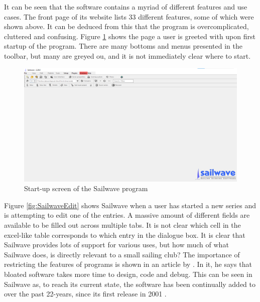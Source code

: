 \documentclass{l4proj}
\begin{document}
It can be seen that the software contains a myriad of different features and use cases. The front page of its website lists 33 different features, some of which were shown above. It can be deduced from this that the program is overcomplicated, cluttered and confusing.
Figure \ref{fig:SailwaveEmpty} shows the page a user is greeted with upon first startup of the program. There are many bottoms and menus presented in the toolbar, but many are greyed ou, and it is not immediately clear where to start.

\begin{figure}[H]
    \centering
    \includegraphics[width=1\linewidth]{images/SailwaveEmpty.png} 

    \caption{Start-up screen of the Sailwave program \citep{sailwave}
    }

    \label{fig:SailwaveEmpty} 
\end{figure}

Figure \ref{fig:SailwaveEdit} shows Sailwave when a user has started a new series and is attempting to edit one of the entries. A massive amount of different fields are available to be filled out across multiple tabs. It is not clear which cell in the excel-like table corresponds to which entry in the dialogue box. It is clear that Sailwave provides lots of support for various uses, but how much of what Sailwave does, is directly relevant to a small sailing club? The importance of restricting the features of programs is shown in an article by \citet{leanSoftware}. In it, he says that bloated software takes more time to design, code and debug. This can be seen in Sailwave as, to reach its current state, the software has been continually added to over the past 22-years, since its first release in 2001 \citep{sailwave}.
\end{document}
